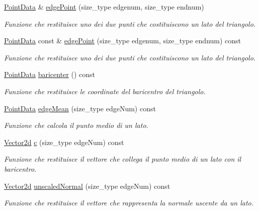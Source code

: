 \begin{DoxyCompactItemize}
\hyperlink{classPointData}{Point\-Data} \& \hyperlink{classTriangleData_a6b8d98b054e9b094ba6b6ccf4217246b}{edge\-Point} (size\-\_\-type edgenum, size\-\_\-type endnum)
\begin{DoxyCompactList}\small\item\em Funzione che restituisce uno dei due punti che costituiscono un lato del triangolo. \end{DoxyCompactList}\item 
\hyperlink{classPointData}{Point\-Data} const \& \hyperlink{classTriangleData_a30665b2010f85d6b9223581e31e79308}{edge\-Point} (size\-\_\-type edgenum, size\-\_\-type endnum) const 
\begin{DoxyCompactList}\small\item\em Funzione che restituisce uno dei due punti che costituiscono un lato del triangolo. \end{DoxyCompactList}\item 
\hyperlink{classPointData}{Point\-Data} \hyperlink{classTriangleData_af52f48a6b75c258927b0b4ea29d4c383}{baricenter} () const 
\begin{DoxyCompactList}\small\item\em Funzione che restituisce le coordinate del baricentro del triangolo. \end{DoxyCompactList}\item 
\hyperlink{classPointData}{Point\-Data} \hyperlink{classTriangleData_a0642b843819fc842bad0be2f35f15be3}{edge\-Mean} (size\-\_\-type edge\-Num) const 
\begin{DoxyCompactList}\small\item\em Funzione che calcola il punto medio di un lato. \end{DoxyCompactList}\item 
\hyperlink{Core_8h_a09205951ae66bf900cc5cc57e2192667}{Vector2d} \hyperlink{classTriangleData_a4278f62058529df47e095421d02599ad}{c} (size\-\_\-type edge\-Num) const 
\begin{DoxyCompactList}\small\item\em Funzione che restituisce il vettore che collega il punto medio di un lato con il baricentro. \end{DoxyCompactList}\item 
\hyperlink{Core_8h_a09205951ae66bf900cc5cc57e2192667}{Vector2d} \hyperlink{classTriangleData_a3b110e4ceb09cc5368fcecad9938a1c8}{unscaled\-Normal} (size\-\_\-type edge\-Num) const 
\begin{DoxyCompactList}\small\item\em Funzione che restituisce il vettore che rappresenta la normale uscente da un lato. \end{DoxyCompactList}\item 

\end{DoxyCompactItemize}
